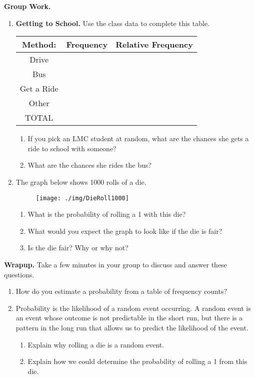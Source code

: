 \textbf{Group Work.}
\begin{enumerate}
\item \textbf{Getting to School.} Use the class data to complete this table.

\begin{table}[h]\centering
\begin{tabular}{|c|c|c|}\hline
Method:&Frequency&Relative Frequency\\
\hline
Drive&&\\
\hline
Bus&&\\
\hline
Get a Ride&&\\
\hline
Other&&\\
\hline
TOTAL&&\\
\hline
\end{tabular}
\end{table}
\begin{enumerate}
\item If you pick an LMC student at random, what are the chances she gets a ride to school with someone?\\[.5cm] 
\item What are the chances she rides the bus?\\[.5cm]
\end{enumerate}
\newpage
\item The graph below shows 1000 rolls of a die.

\begin{figure}[H]
\centering{}\texttt{[image: ./img/DieRoll1000]} 
\end{figure}

\begin{enumerate}
\item What is the probability of rolling a 1 with this die?\\[.5cm]
\item What would you expect the graph to look like if the die is fair?\\[.5cm]
\item Is the die fair? Why or why not?\\[.5cm]
\end{enumerate}
\end{enumerate}

\textbf{Wrapup.} Take a few minutes in your group to discuss and answer these questions.
\begin{enumerate}
\item How do you estimate a probability from a table of frequency counts?\\[.5in]
\item Probability is the likelihood of a random event occurring. A random event is an event whose outcome is not predictable in the short run, but there is a pattern in the long run that allows us to predict the likelihood of the event.
\begin{enumerate}
\item Explain why rolling a die is a random event.\\[.5cm]
\item Explain how we could determine the probability of rolling a 1 from this die.
\end{enumerate}
\end{enumerate}

